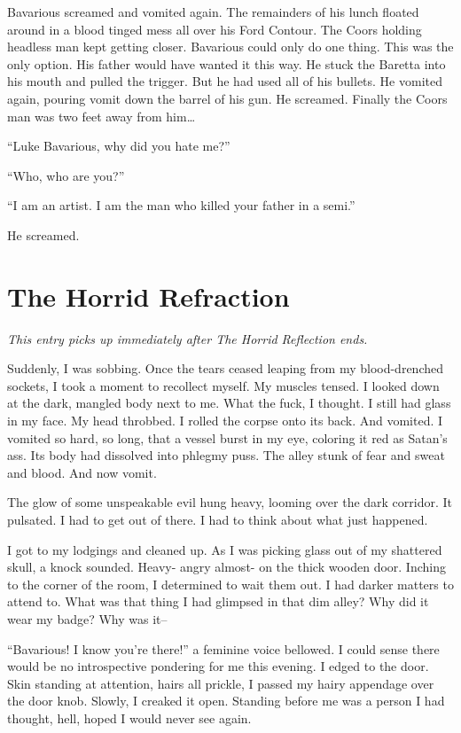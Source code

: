 Bavarious screamed and vomited again. The remainders of his lunch
floated around in a blood tinged mess all over his Ford Contour.
The Coors holding headless man kept getting closer. Bavarious could
only do one thing. This was the only option. His father would have
wanted it this way. He stuck the Baretta into his mouth and pulled
the trigger. But he had used all of his bullets. He vomited again,
pouring vomit down the barrel of his gun. He screamed. Finally the
Coors man was two feet away from him{\ldots}



``Luke Bavarious, why did you hate me?''

``Who, who are you?''

``I am an artist. I am the man who killed your father in a
semi.''

He screamed. 
 



\chapter{The Horrid Refraction}


{\em This entry picks up immediately after {\rm The Horrid Reflection}
ends.}


Suddenly, I was sobbing. Once the tears ceased leaping from my
blood-drenched sockets, I took a moment to recollect myself. My
muscles tensed. I looked down at the dark, mangled body next to me.
What the fuck, I thought. I still had glass in my face. My head
throbbed. I rolled the corpse onto its back. And vomited. I vomited
so hard, so long, that a vessel burst in my eye, coloring it red as
Satan's ass. Its body had dissolved into phlegmy puss. The alley
stunk of fear and sweat and blood. And now vomit.

The glow of some unspeakable evil hung heavy, looming over the dark
corridor. It pulsated. I had to get out of there. I had to think
about what just happened.

I got to my lodgings and cleaned up. As I was picking glass out of
my shattered skull, a knock sounded. Heavy- angry almost- on the
thick wooden door. Inching to the corner of the room, I determined
to wait them out. I had darker matters to attend to. What was that
thing I had glimpsed in that dim alley? Why did it wear my badge?
Why was it--

``Bavarious! I know you're there!'' a feminine voice bellowed. I
could sense there would be no introspective pondering for me this
evening. I edged to the door. Skin standing at attention, hairs all
prickle, I passed my hairy appendage over the door knob. Slowly, I
creaked it open. Standing before me was a person I had thought,
hell, hoped I would never see again.


